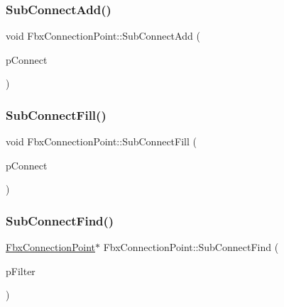 \subsubsection{\texorpdfstring{Sub\+Connect\+Add()}{SubConnectAdd()}}
{\footnotesize\ttfamily void Fbx\+Connection\+Point\+::\+Sub\+Connect\+Add (\begin{DoxyParamCaption}\item[{\hyperlink{class_fbx_connection_point}{Fbx\+Connection\+Point} $\ast$}]{p\+Connect }\end{DoxyParamCaption})\hspace{0.3cm}{\ttfamily [protected]}}

\mbox{\label{class_fbx_connection_point_aaad43b803b8051e8b154bceabdd309a2}} 
\subsubsection{\texorpdfstring{Sub\+Connect\+Fill()}{SubConnectFill()}}
{\footnotesize\ttfamily void Fbx\+Connection\+Point\+::\+Sub\+Connect\+Fill (\begin{DoxyParamCaption}\item[{\hyperlink{class_fbx_connection_point}{Fbx\+Connection\+Point} $\ast$}]{p\+Connect }\end{DoxyParamCaption})\hspace{0.3cm}{\ttfamily [protected]}}

\mbox{\label{class_fbx_connection_point_ab17a0982224639d2fe87bcdf8c3c54ea}} 
\subsubsection{\texorpdfstring{Sub\+Connect\+Find()}{SubConnectFind()}}
{\footnotesize\ttfamily \hyperlink{class_fbx_connection_point}{Fbx\+Connection\+Point}$\ast$ Fbx\+Connection\+Point\+::\+Sub\+Connect\+Find (\begin{DoxyParamCaption}\item[{\hyperlink{class_fbx_connection_point_filter}{Fbx\+Connection\+Point\+Filter} $\ast$}]{p\+Filter }\end{DoxyParamCaption})\hspace{0.3cm}{\ttfamily [protected]}}

